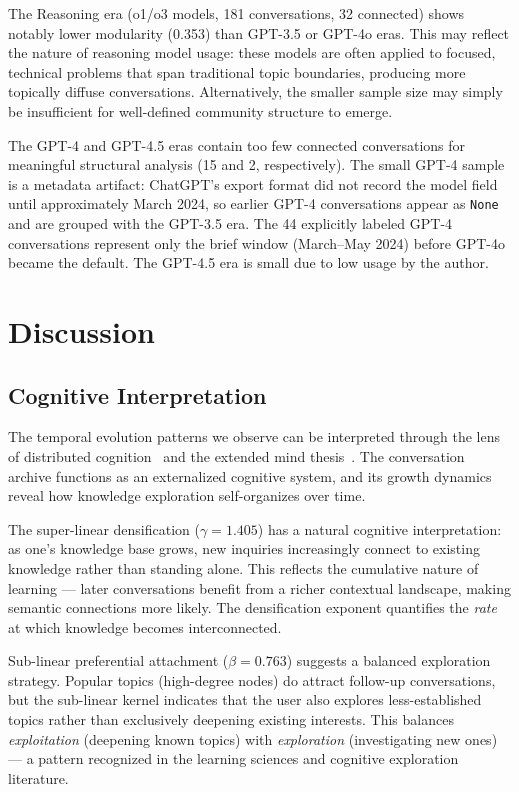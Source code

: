 \documentclass[10pt,letterpaper]{article}
\begin{document}
The Reasoning era (o1/o3 models, 181 conversations, 32 connected) shows notably lower modularity (0.353) than GPT-3.5 or GPT-4o eras. This may reflect the nature of reasoning model usage: these models are often applied to focused, technical problems that span traditional topic boundaries, producing more topically diffuse conversations. Alternatively, the smaller sample size may simply be insufficient for well-defined community structure to emerge.

The GPT-4 and GPT-4.5 eras contain too few connected conversations for meaningful structural analysis (15 and 2, respectively). The small GPT-4 sample is a metadata artifact: ChatGPT's export format did not record the model field until approximately March 2024, so earlier GPT-4 conversations appear as \texttt{None} and are grouped with the GPT-3.5 era. The 44 explicitly labeled GPT-4 conversations represent only the brief window (March--May 2024) before GPT-4o became the default. The GPT-4.5 era is small due to low usage by the author.


\section{Discussion}
\label{sec:discussion}

\subsection{Cognitive Interpretation}
\label{sec:cognitive}

The temporal evolution patterns we observe can be interpreted through the lens of distributed cognition~\citep{hutchins1995cognition} and the extended mind thesis~\citep{clark1998extended}. The conversation archive functions as an externalized cognitive system, and its growth dynamics reveal how knowledge exploration self-organizes over time.

The super-linear densification ($\gamma = 1.405$) has a natural cognitive interpretation: as one's knowledge base grows, new inquiries increasingly connect to existing knowledge rather than standing alone. This reflects the cumulative nature of learning --- later conversations benefit from a richer contextual landscape, making semantic connections more likely. The densification exponent quantifies the \emph{rate} at which knowledge becomes interconnected.

Sub-linear preferential attachment ($\beta = 0.763$) suggests a balanced exploration strategy. Popular topics (high-degree nodes) do attract follow-up conversations, but the sub-linear kernel indicates that the user also explores less-established topics rather than exclusively deepening existing interests. This balances \emph{exploitation} (deepening known topics) with \emph{exploration} (investigating new ones) --- a pattern recognized in the learning sciences and cognitive exploration literature.
\end{document}
